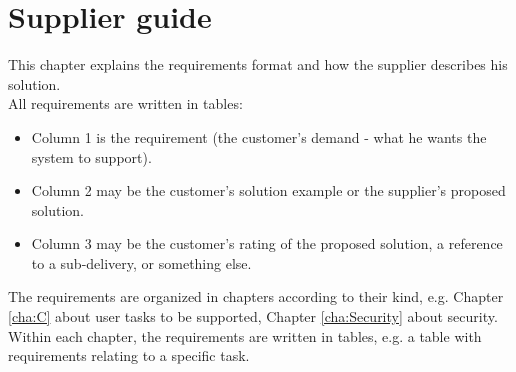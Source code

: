\documentclass[Main]{subfiles}
\begin{document}
\section{Supplier guide}

This chapter explains the requirements format and how the supplier describes his solution.
\\
All requirements are written in tables:
\begin{itemize}
\item Column 1 is the requirement (the customer's demand - what he wants the system to support). 

\item Column 2 may be the customer's solution example or the supplier's proposed solution.

\item Column 3 may be the customer's rating of the proposed solution, a reference to a sub-delivery, or something else.

\end{itemize}

The requirements are organized in chapters according to their kind, e.g. Chapter \ref{cha:C} about user tasks to be supported, Chapter \ref{cha:Security} about security. 
Within each chapter, the requirements are written in tables, e.g. a table with requirements relating to a specific task. 
\end{document}
